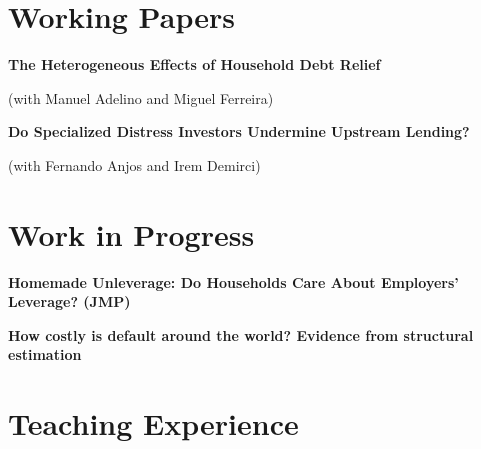 \documentclass[letterpaper]{article}
\newenvironment{itemize*}{
  \begin{list}{}{
    \setlength{\leftmargin}{1.5em}
  }
}{
  \end{list}
}
\begin{document}
\section*{Working Papers}

\begin{itemize*}
\item \textbf{The Heterogeneous Effects of Household Debt Relief}

	(with Manuel Adelino and Miguel Ferreira)
\medskip
	
\item \textbf{Do Specialized Distress Investors Undermine Upstream Lending?}

	(with Fernando Anjos and Irem Demirci)

\end{itemize*}

\section*{Work in Progress}

\begin{itemize*}
\item \textbf{Homemade Unleverage: Do Households Care About Employers' Leverage? (JMP)}
\item \textbf{How costly is default around the world? Evidence from structural estimation}
\end{itemize*}

\section*{Teaching Experience}
\end{document}
